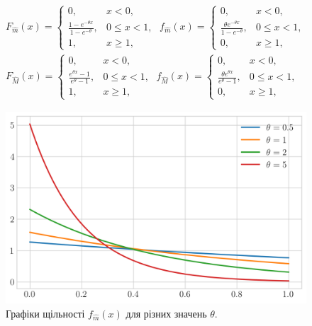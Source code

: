 \begin{theorem}
    \begin{gather}
        F_{\widehat{m}}(x) = \begin{cases}
            0, & x < 0, \\
            \frac{1 - e^{-\theta x}}{1 - e^{-\theta}}, & 0 \leq x < 1, \\
            1, & x \geq 1,
        \end{cases}\;
        f_{\widehat{m}}(x) = \begin{cases}
            0, & x < 0, \\
            \frac{\theta e^{-\theta x}}{1 - e^{-\theta}}, & 0 \leq x < 1, \\
            0, & x \geq 1,
        \end{cases}
        \\
        F_{\widehat{M}}(x) = \begin{cases}
            0, & x < 0, \\
            \frac{e^{\theta x} - 1}{e^{\theta} - 1}, & 0 \leq x < 1, \\
            1, & x \geq 1,
        \end{cases}\;
        f_{\widehat{M}}(x) = \begin{cases}
            0, & x < 0, \\
            \frac{\theta e^{\theta x}}{e^{\theta} - 1}, & 0 \leq x < 1, \\
            0, & x \geq 1,
        \end{cases}
    \end{gather}
    \begin{figure}[H]
        \centering
        \includegraphics[scale=0.65]{plots/pdf_min_hat.png}
        \caption{Графіки щільності $f_{\widehat{m}}(x)$ для різних значень $\theta$.}

\end{figure}
\end{theorem}
